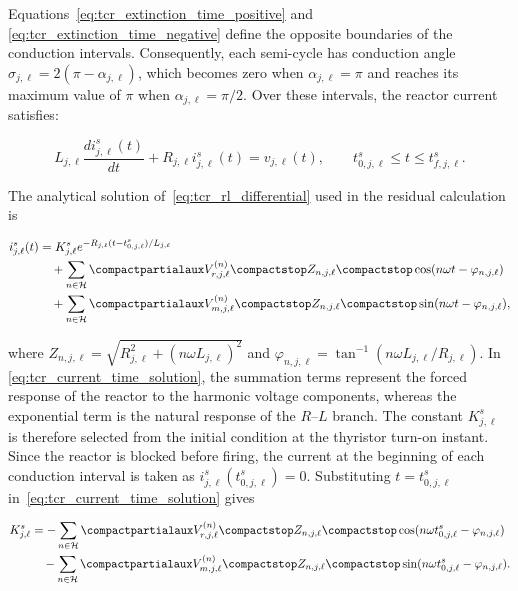 \documentclass[journal]{IEEEtran}
\begin{document}
Equations~\eqref{eq:tcr_extinction_time_positive} and
\eqref{eq:tcr_extinction_time_negative} define the opposite boundaries of
the conduction intervals. Consequently, each semi-cycle has conduction angle
$\sigma_{j,\ell}=2(\pi-\alpha_{j,\ell})$, which becomes zero when
$\alpha_{j,\ell}=\pi$ and reaches its maximum value of $\pi$ when
$\alpha_{j,\ell}=\pi/2$. Over these intervals, the reactor current satisfies:

\begin{equation}
    L_{j,\ell}\frac{di_{j,\ell}^{s}(t)}{dt}
    +R_{j,\ell}i_{j,\ell}^{s}(t)=v_{j,\ell}(t),
    \qquad t_{0,j,\ell}^{s}\leq t\leq t_{f,j,\ell}^{s}.
    \label{eq:tcr_rl_differential}
\end{equation}

The analytical solution of~\eqref{eq:tcr_rl_differential} used in the
residual calculation is

\begin{align}
    i_{j,\ell}^{s}(t)
    &=K_{j,\ell}^{s}
      e^{-R_{j,\ell}(t-t_{0,j,\ell}^{s})/L_{j,\ell}} \notag \\
    &\quad + \sum_{n\in\mathcal{H}}
      \frac{V_{r,j,\ell}^{(n)}}{Z_{n,j,\ell}}
      \cos(n\omega t-\varphi_{n,j,\ell}) \notag \\
    &\quad + \sum_{n\in\mathcal{H}}
      \frac{V_{m,j,\ell}^{(n)}}{Z_{n,j,\ell}}
      \sin(n\omega t-\varphi_{n,j,\ell}),
    \label{eq:tcr_current_time_solution}
\end{align}

\noindent where
$Z_{n,j,\ell}=\sqrt{R_{j,\ell}^{2}+(n\omega L_{j,\ell})^{2}}$ and
$\varphi_{n,j,\ell}=\tan^{-1}(n\omega L_{j,\ell}/R_{j,\ell})$. In
\eqref{eq:tcr_current_time_solution}, the summation terms represent the
forced response of the reactor to the harmonic voltage components, whereas
the exponential term is the natural response of the $R$--$L$ branch. The
constant $K_{j,\ell}^{s}$ is therefore selected from the initial condition
at the thyristor turn-on instant. Since the reactor is blocked before
firing, the current at the beginning of each conduction interval is taken as
$i_{j,\ell}^{s}(t_{0,j,\ell}^{s})=0$. Substituting
$t=t_{0,j,\ell}^{s}$ in~\eqref{eq:tcr_current_time_solution} gives

\begin{align}
    K_{j,\ell}^{s}
    &= -\sum_{n\in\mathcal{H}}
    \frac{V_{r,j,\ell}^{(n)}}{Z_{n,j,\ell}}
    \cos(n\omega t_{0,j,\ell}^{s}-\varphi_{n,j,\ell}) \notag \\
    &\quad -\sum_{n\in\mathcal{H}}
    \frac{V_{m,j,\ell}^{(n)}}{Z_{n,j,\ell}}
    \sin(n\omega t_{0,j,\ell}^{s}-\varphi_{n,j,\ell}) .
    \label{eq:tcr_initial_constant}
\end{align}
\end{document}
